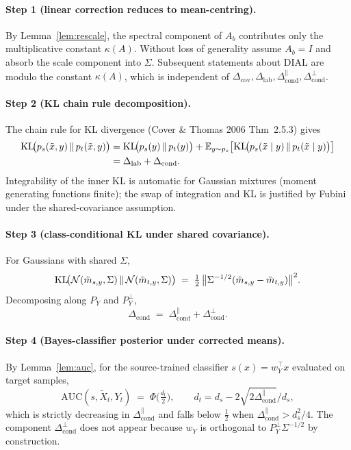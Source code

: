 \paragraph{Step 1 (linear correction reduces to mean-centring).}
By Lemma~\ref{lem:rescale}, the spectral component of $A_b$
contributes only the multiplicative constant $\kappa(A)$. Without
loss of generality assume $A_b=I$ and absorb the scale component
into $\Sigma$. Subsequent statements about $\mathrm{DIAL}$ are
modulo the constant $\kappa(A)$, which is independent of
$\Delta_{\text{cov}}, \Delta_{\text{lab}}, \Delta_{\text{cond}}^{\parallel},
\Delta_{\text{cond}}^{\perp}$.

\paragraph{Step 2 (KL chain rule decomposition).}
The chain rule for KL divergence (Cover \& Thomas 2006 Thm~2.5.3)
gives
\begin{align*}
  \mathrm{KL}\!\bigl(p_s(\tilde x,y)\,\|\,p_t(\tilde x,y)\bigr)
   &= \mathrm{KL}\!\bigl(p_s(y)\,\|\,p_t(y)\bigr)
      + \mathbb{E}_{y\sim p_s}\bigl[
        \mathrm{KL}\!\bigl(p_s(\tilde x\mid y)\,\|\,
                   p_t(\tilde x\mid y)\bigr)\bigr]\\
   &= \Delta_{\text{lab}} + \Delta_{\text{cond}}.
\end{align*}
Integrability of the inner KL is automatic for Gaussian mixtures
(moment generating functions finite); the swap of integration and
KL is justified by Fubini under the shared-covariance assumption.

\paragraph{Step 3 (class-conditional KL under shared covariance).}
For Gaussians with shared $\Sigma$,
\[
  \mathrm{KL}\!\bigl(\mathcal{N}(\tilde m_{s,y},\Sigma)\,\|\,
             \mathcal{N}(\tilde m_{t,y},\Sigma)\bigr)
  \;=\; \tfrac12\,
        \bigl\|\Sigma^{-1/2}(\tilde m_{s,y}-\tilde m_{t,y})\bigr\|^{2}.
\]
Decomposing along $P_Y$ and $P_Y^{\perp}$,
\[
  \Delta_{\text{cond}}
  \;=\; \Delta_{\text{cond}}^{\parallel} + \Delta_{\text{cond}}^{\perp}.
\]

\paragraph{Step 4 (Bayes-classifier posterior under corrected means).}
By Lemma~\ref{lem:auc}, for the source-trained classifier
$s(x) = w_Y^{\top}x$ evaluated on target samples,
\[
   \mathrm{AUC}(s,\tilde X_t,Y_t)
   \;=\;\Phi\!\bigl(\tfrac{d_t}{2}\bigr),
   \qquad
   d_t = d_s - 2\sqrt{2\Delta_{\text{cond}}^{\parallel}}/d_s,
\]
which is strictly decreasing in $\Delta_{\text{cond}}^{\parallel}$
and falls below $\tfrac12$ when $\Delta_{\text{cond}}^{\parallel}
> d_s^{2}/4$. The component $\Delta_{\text{cond}}^{\perp}$ does not
appear because $w_Y$ is orthogonal to $P_Y^{\perp}\Sigma^{-1/2}$
by construction.

